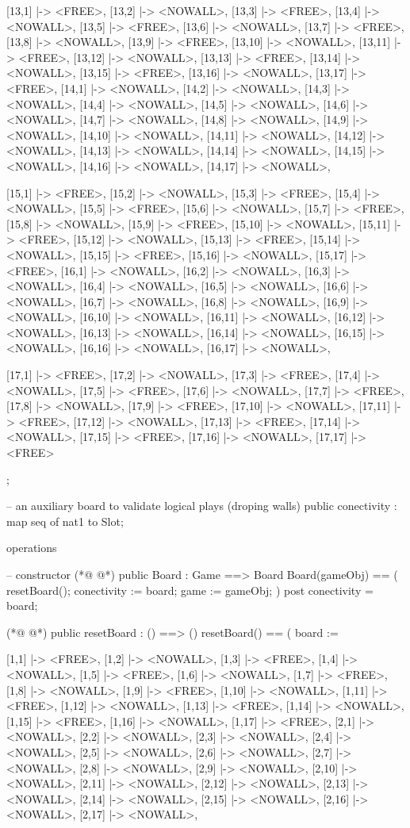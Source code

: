 \begin{vdmpp}[breaklines=true]
{     [13,1] |-> <FREE>, [13,2] |-> <NOWALL>, [13,3] |-> <FREE>, [13,4] |-> <NOWALL>, [13,5] |-> <FREE>, [13,6] |-> <NOWALL>, [13,7] |-> <FREE>, [13,8] |-> <NOWALL>, [13,9] |-> <FREE>, [13,10] |-> <NOWALL>, 
     [13,11] |-> <FREE>, [13,12] |-> <NOWALL>, [13,13] |-> <FREE>, [13,14] |-> <NOWALL>, [13,15] |-> <FREE>, [13,16] |-> <NOWALL>, [13,17] |-> <FREE>,
     [14,1] |-> <NOWALL>, [14,2] |-> <NOWALL>, [14,3] |-> <NOWALL>, [14,4] |-> <NOWALL>, [14,5] |-> <NOWALL>, [14,6] |-> <NOWALL>, [14,7] |-> <NOWALL>, [14,8] |-> <NOWALL>, [14,9] |-> <NOWALL>, [14,10] |-> <NOWALL>, 
     [14,11] |-> <NOWALL>, [14,12] |-> <NOWALL>, [14,13] |-> <NOWALL>, [14,14] |-> <NOWALL>, [14,15] |-> <NOWALL>, [14,16] |-> <NOWALL>, [14,17] |-> <NOWALL>,
  
     [15,1] |-> <FREE>, [15,2] |-> <NOWALL>, [15,3] |-> <FREE>, [15,4] |-> <NOWALL>, [15,5] |-> <FREE>, [15,6] |-> <NOWALL>, [15,7] |-> <FREE>, [15,8] |-> <NOWALL>, [15,9] |-> <FREE>, [15,10] |-> <NOWALL>, 
     [15,11] |-> <FREE>, [15,12] |-> <NOWALL>, [15,13] |-> <FREE>, [15,14] |-> <NOWALL>, [15,15] |-> <FREE>, [15,16] |-> <NOWALL>, [15,17] |-> <FREE>,
     [16,1] |-> <NOWALL>, [16,2] |-> <NOWALL>, [16,3] |-> <NOWALL>, [16,4] |-> <NOWALL>, [16,5] |-> <NOWALL>, [16,6] |-> <NOWALL>, [16,7] |-> <NOWALL>, [16,8] |-> <NOWALL>, [16,9] |-> <NOWALL>, [16,10] |-> <NOWALL>, 
     [16,11] |-> <NOWALL>, [16,12] |-> <NOWALL>, [16,13] |-> <NOWALL>, [16,14] |-> <NOWALL>, [16,15] |-> <NOWALL>, [16,16] |-> <NOWALL>, [16,17] |-> <NOWALL>,
     
     [17,1] |-> <FREE>, [17,2] |-> <NOWALL>, [17,3] |-> <FREE>, [17,4] |-> <NOWALL>, [17,5] |-> <FREE>, [17,6] |-> <NOWALL>, [17,7] |-> <FREE>, [17,8] |-> <NOWALL>, [17,9] |-> <FREE>, [17,10] |-> <NOWALL>, 
     [17,11] |-> <FREE>, [17,12] |-> <NOWALL>, [17,13] |-> <FREE>, [17,14] |-> <NOWALL>, [17,15] |-> <FREE>, [17,16] |-> <NOWALL>, [17,17] |-> <FREE>
   };
   
  -- an auxiliary board to validate logical plays (droping walls)
  public conectivity : map seq of nat1 to Slot;
 
 operations
 
  -- constructor
(*@
\label{Board:73}
@*)
  public Board : Game ==> Board
  Board(gameObj) == 
  (
   resetBoard();
   conectivity := board;
   game := gameObj;
  )
  post conectivity = board;
  
(*@
\label{resetBoard:82}
@*)
  public resetBoard : () ==> ()
  resetBoard() ==
  (
   board := { 
     [1,1] |-> <FREE>, [1,2] |-> <NOWALL>, [1,3] |-> <FREE>, [1,4] |-> <NOWALL>, [1,5] |-> <FREE>, [1,6] |-> <NOWALL>, [1,7] |-> <FREE>, [1,8] |-> <NOWALL>, [1,9] |-> <FREE>, [1,10] |-> <NOWALL>, 
     [1,11] |-> <FREE>, [1,12] |-> <NOWALL>, [1,13] |-> <FREE>, [1,14] |-> <NOWALL>, [1,15] |-> <FREE>, [1,16] |-> <NOWALL>, [1,17] |-> <FREE>,
     [2,1] |-> <NOWALL>, [2,2] |-> <NOWALL>, [2,3] |-> <NOWALL>, [2,4] |-> <NOWALL>, [2,5] |-> <NOWALL>, [2,6] |-> <NOWALL>, [2,7] |-> <NOWALL>, [2,8] |-> <NOWALL>, [2,9] |-> <NOWALL>, [2,10] |-> <NOWALL>, 
     [2,11] |-> <NOWALL>, [2,12] |-> <NOWALL>, [2,13] |-> <NOWALL>, [2,14] |-> <NOWALL>, [2,15] |-> <NOWALL>, [2,16] |-> <NOWALL>, [2,17] |-> <NOWALL>,
     
}
\end{vdmpp}
